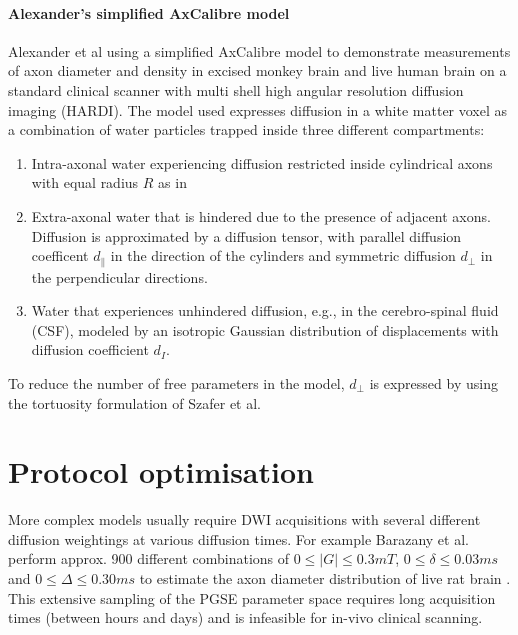 \paragraph*{Alexander's simplified AxCalibre model}
Alexander et al\cite{alexander2009} using a simplified AxCalibre model to demonstrate measurements of axon diameter and density in excised monkey brain and live human brain on a standard clinical scanner with multi shell high angular resolution diffusion imaging (HARDI). The model used expresses diffusion in a white matter voxel as a combination of water particles trapped inside three different compartments: 
\begin{enumerate}
  \item Intra-axonal water experiencing diffusion restricted inside cylindrical axons with equal radius $R$ as in \cite{gelderen2000}
  \item Extra-axonal water that is hindered due to the presence of adjacent axons. Diffusion is approximated by a diffusion tensor, with parallel diffusion coefficent $d_\parallel$ in the direction of the cylinders and symmetric diffusion $d_\perp$ in the perpendicular directions.
  \item Water that experiences unhindered diffusion, e.g., in the cerebro-spinal fluid (CSF), modeled by an isotropic Gaussian distribution of displacements with diffusion coefficient $d_{I}$.
\end{enumerate}
To reduce the number of free parameters in the model, $d_\perp$ is expressed by using the tortuosity formulation of Szafer et al\cite{szafer1995}.

\section{Protocol optimisation}
More complex models usually require DWI acquisitions with several different diffusion weightings at various diffusion times. For example Barazany et al.\cite{assaf08} perform approx. 900 different combinations of $0\le|G|\le 0.3mT$, $0\le \delta \le 0.03ms$ and $0\le \Delta \le 0.30ms$ to estimate the axon diameter distribution of live rat brain \cite{TODO}. This extensive sampling of the PGSE parameter space requires long acquisition times (between hours and days) and is infeasible for in-vivo clinical scanning. 

